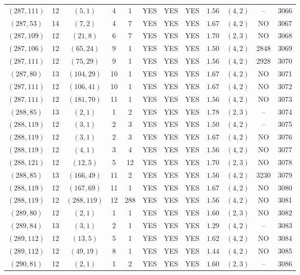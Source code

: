 \begin{longtable}{|c|c|c|c|c|c|c|c|c|c|c|c|}
$(287,111)$ & 12 & $(5,1)$ & 4 & 1 & YES & YES & YES & $1.56$ & $(4,2)$ & -- & 3066\\
$(287,53)$ & 14 & $(7,2)$ & 4 & 7 & YES & YES & YES & $1.67$ & $(4,2)$ & NO & 3067\\
$(287,109)$ & 12 & $(21,8)$ & 6 & 7 & YES & YES & YES & $1.70$ & $(2,3)$ & NO & 3068\\
$(287,106)$ & 12 & $(65,24)$ & 9 & 1 & YES & YES & YES & $1.50$ & $(4,2)$ & 2848 & 3069\\
$(287,111)$ & 12 & $(75,29)$ & 9 & 1 & YES & YES & YES & $1.56$ & $(4,2)$ & 2928 & 3070\\
$(287,80)$ & 13 & $(104,29)$ & 10 & 1 & YES & YES & YES & $1.67$ & $(4,2)$ & NO & 3071\\
$(287,111)$ & 12 & $(106,41)$ & 10 & 1 & YES & YES & YES & $1.67$ & $(4,2)$ & NO & 3072\\
$(287,111)$ & 12 & $(181,70)$ & 11 & 1 & YES & YES & YES & $1.56$ & $(4,2)$ & NO & 3073\\
$(288,85)$ & 13 & $(2,1)$ & 1 & 2 & YES & YES & YES & $1.78$ & $(2,3)$ & -- & 3074\\
$(288,119)$ & 12 & $(3,1)$ & 2 & 3 & YES & YES & YES & $1.50$ & $(4,2)$ & -- & 3075\\
$(288,119)$ & 12 & $(3,1)$ & 2 & 3 & YES & YES & YES & $1.67$ & $(4,2)$ & NO & 3076\\
$(288,119)$ & 12 & $(4,1)$ & 3 & 4 & YES & YES & YES & $1.56$ & $(4,2)$ & NO & 3077\\
$(288,121)$ & 12 & $(12,5)$ & 5 & 12 & YES & YES & YES & $1.70$ & $(2,3)$ & NO & 3078\\
$(288,85)$ & 13 & $(166,49)$ & 11 & 2 & YES & YES & YES & $1.56$ & $(4,2)$ & 3230 & 3079\\
$(288,119)$ & 12 & $(167,69)$ & 11 & 1 & YES & YES & YES & $1.67$ & $(4,2)$ & NO & 3080\\
$(288,119)$ & 12 & $(288,119)$ & 12 & 288 & YES & YES & YES & $1.56$ & $(4,2)$ & NO & 3081\\
$(289,80)$ & 12 & $(2,1)$ & 1 & 1 & YES & YES & YES & $1.60$ & $(2,3)$ & NO & 3082\\
$(289,84)$ & 13 & $(3,1)$ & 2 & 1 & YES & YES & YES & $1.29$ & $(4,2)$ & -- & 3083\\
$(289,112)$ & 12 & $(13,5)$ & 5 & 1 & YES & YES & YES & $1.62$ & $(4,2)$ & NO & 3084\\
$(289,112)$ & 12 & $(49,19)$ & 8 & 1 & YES & YES & YES & $1.44$ & $(4,2)$ & NO & 3085\\
$(290,81)$ & 12 & $(2,1)$ & 1 & 2 & YES & YES & YES & $1.60$ & $(2,3)$ & -- & 3086\\

\end{longtable}
